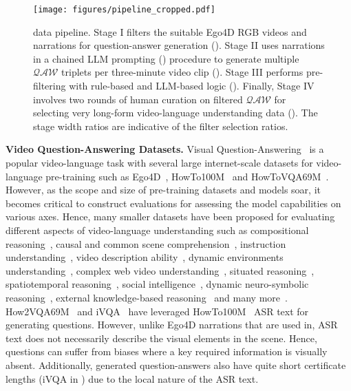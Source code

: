 \begin{figure}[t!]
\center
\texttt{[image: figures/pipeline\_cropped.pdf]}
\caption{\name{}{} data pipeline. Stage I filters the suitable Ego4D RGB videos and narrations for question-answer generation (). Stage II uses narrations in a chained \colorbox{llm}{LLM prompting} () procedure to generate multiple $\mathcal{QAW}$ triplets per three-minute video clip (). Stage III performs pre-filtering with \colorbox{rule}{rule-based} and \colorbox{llm}{LLM-based} logic (). Finally, Stage IV involves two rounds of \colorbox{human}{human} curation on filtered $\mathcal{QAW}$ for selecting very long-form video-language understanding data (). The stage width ratios are indicative of the filter selection ratios.}
\label{fig:pipeline}
\end{figure}

\noindent \textbf{Video Question-Answering Datasets.}
Visual Question-Answering~\cite{vqa} is a popular video-language task with several large internet-scale datasets for video-language pre-training such as Ego4D~\cite{ego4d}, HowTo100M~\cite{howto100m} and HowToVQA69M~\cite{ivqa}. However, as the scope and size of pre-training datasets and models soar, it becomes critical to construct evaluations for assessing the model capabilities on various axes. Hence, many smaller datasets have been proposed for evaluating different aspects of video-language understanding such as compositional reasoning~\cite{agqa, agqa2}, causal and common scene comprehension~\cite{nextqa}, instruction understanding~\cite{ivqa, how2qa}, video description ability~\cite{msrvtt}, dynamic environments understanding~\cite{envqa}, complex web video understanding~\cite{activitynetqa}, situated reasoning~\cite{star}, spatiotemporal reasoning~\cite{tgif}, social intelligence~\cite{socialiq}, dynamic neuro-symbolic reasoning~\cite{clevrer}, external knowledge-based reasoning~\cite{knowit} and many more~\cite{marioqa, youtube2textqa, asrl, fiber, wildqa, v2c, svqa, sutd, tvqa, tvqa+, lifeqa, pano, dramaqa, musicavqa, avqa, pstuts, knowitx, newskvqa}. How2VQA69M~\cite{ivqa} and iVQA~\cite{ivqa} have leveraged HowTo100M~\cite{howto100m} ASR text for generating questions. However, unlike Ego4D narrations that are used in\name{}{}, ASR text does not necessarily describe the visual elements in the scene. Hence, questions can suffer from biases where a key required information is visually absent. Additionally, generated question-answers also have quite short certificate lengths (iVQA in ) due to the local nature of the ASR text.  

